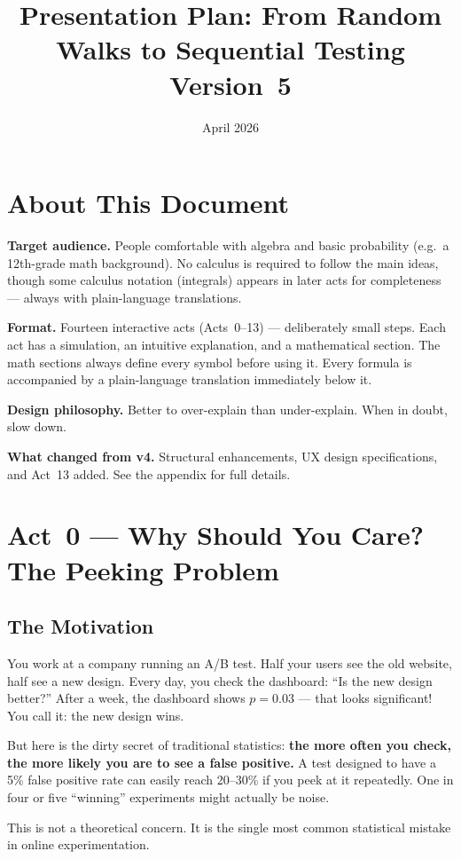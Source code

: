 \documentclass[12pt, a4paper]{article}
\title{\textbf{Presentation Plan: From Random Walks to Sequential Testing}\\[6pt]
       \large Version~5}
\author{}
\date{April 2026}
\begin{document}
\maketitle
\tableofcontents
\newpage

\section*{About This Document}

\textbf{Target audience.}
People comfortable with algebra and basic probability (e.g.\ a 12th-grade
math background).  No calculus is required to follow the main ideas, though
some calculus notation (integrals) appears in later acts for completeness ---
always with plain-language translations.

\textbf{Format.}
Fourteen interactive acts (Acts~0--13) --- deliberately small steps.  Each act
has a simulation, an intuitive explanation, and a mathematical section.  The
math sections always define every symbol before using it.  Every formula is
accompanied by a plain-language translation immediately below it.

\textbf{Design philosophy.}
Better to over-explain than under-explain.  When in doubt, slow down.

\textbf{What changed from v4.}
Structural enhancements, UX design specifications, and Act~13 added.
See the appendix for full details.


\newpage
\section{Act~0 --- Why Should You Care?  The Peeking Problem}

\subsection{The Motivation}

\begin{intuition}
You work at a company running an A/B test.  Half your users see the old
website, half see a new design.  Every day, you check the dashboard:
``Is the new design better?''  After a week, the dashboard shows $p=0.03$ ---
that looks significant!  You call it: the new design wins.

But here is the dirty secret of traditional statistics: \textbf{the more often
you check, the more likely you are to see a false positive.}  A test designed
to have a 5\% false positive rate can easily reach 20--30\% if you peek at it
repeatedly.  One in four or five ``winning'' experiments might actually be noise.

This is not a theoretical concern.  It is the single most common statistical
mistake in online experimentation.
\end{intuition}
\end{document}
